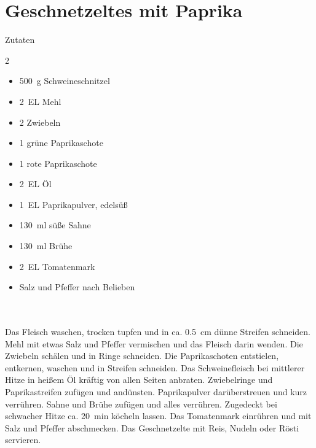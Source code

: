 \section*{Geschnetzeltes mit Paprika}
\ihead{}\ohead{}
\cfoot{}
{\Large Zutaten}
\begin{multicols}{2}
\begin{itemize}
\item \SI{500}{g} Schweineschnitzel
\item \SI{2}{EL} Mehl
\item \num{2} Zwiebeln
\item \num{1} grüne Paprikaschote
\item \num{1} rote Paprikaschote
\item \SI{2}{EL} Öl
\item \SI{1}{EL} Paprikapulver, edelsüß
\item \SI{130}{ml} süße Sahne
\item \SI{130}{ml} Brühe
\item \SI{2}{EL} Tomatenmark
\item Salz und Pfeffer nach Belieben
\end{itemize}
\end{multicols}
\\
\\
Das Fleisch waschen, trocken tupfen und in ca. \SI{0,5}{cm} dünne Streifen schneiden.
Mehl mit etwas Salz und Pfeffer vermischen und das Fleisch darin wenden.
Die Zwiebeln schälen und in Ringe schneiden.
Die Paprikaschoten entstielen, entkernen, waschen und in Streifen schneiden.
Das Schweinefleisch bei mittlerer Hitze in heißem Öl kräftig von allen Seiten anbraten.
Zwiebelringe und Paprikastreifen zufügen und andünsten.
Paprikapulver darüberstreuen und kurz verrühren.
Sahne und Brühe zufügen und alles verrühren.
Zugedeckt bei schwacher Hitze ca. \SI{20}{min} köcheln lassen.
Das Tomatenmark einrühren und mit Salz und Pfeffer abschmecken.
Das Geschnetzelte mit Reis, Nudeln oder Rösti servieren.
